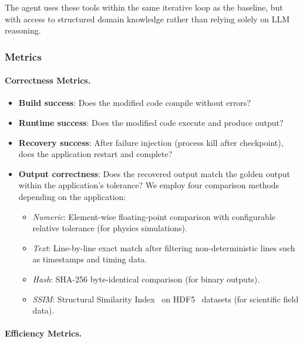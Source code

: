 The agent uses these tools within the same iterative loop as the baseline, but with access to structured domain knowledge rather than relying solely on LLM reasoning.

\subsubsection{Metrics}
\label{sec:metrics}

\paragraph{Correctness Metrics.}

\begin{itemize}
    \item \textbf{Build success}: Does the modified code compile without errors?
    \item \textbf{Runtime success}: Does the modified code execute and produce output?
    \item \textbf{Recovery success}: After failure injection (process kill after checkpoint), does the application restart and complete?
    \item \textbf{Output correctness}: Does the recovered output match the golden output within the application's tolerance? We employ four comparison methods depending on the application:
    \begin{itemize}
        \item \emph{Numeric}: Element-wise floating-point comparison with configurable relative tolerance (for physics simulations).
        \item \emph{Text}: Line-by-line exact match after filtering non-deterministic lines such as timestamps and timing data.
        \item \emph{Hash}: SHA-256 byte-identical comparison (for binary outputs).
        \item \emph{SSIM}: Structural Similarity Index~\cite{ssim} on HDF5~\cite{hdf5} datasets (for scientific field data).
    \end{itemize}
\end{itemize}

\paragraph{Efficiency Metrics.}

